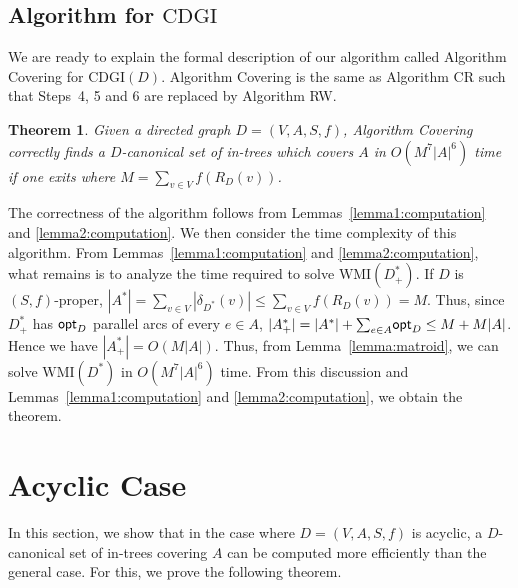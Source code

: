 \documentclass[11pt]{article}
\newcounter{ni}
\theoremstyle{plain}
\newtheorem{theorem}{Theorem}[section]
\newcommand{\eop}{\hfill \usebox{\ProofSym}}
\newenvironment{proof}{\noindent {\it Proof.}}{\eop\par\vspace{0.3cm}}
\begin{document}
\subsection{Algorithm for $\mbox{CDGI}$}

We are ready to explain the formal description of our algorithm 
called Algorithm {\sf Covering} for $\mbox{CDGI}(D)$.
Algorithm {\sf Covering} is the same as Algorithm {\sf CR} such that 
Steps~4, 5 and 6 are replaced by Algorithm {\sf RW}.

\begin{theorem}
Given a directed graph  $D=(V,A,S,f)$, Algorithm {\sf Covering} correctly finds 
a $D$-canonical set of in-trees which covers $A$ in $O(M^7|A|^6)$ time 
if one exits where $M=\sum_{v\in V}f(R_D(v))$.
\end{theorem}
\begin{proof}
The correctness of the algorithm follows from Lemmas~\ref{lemma1:computation} and 
\ref{lemma2:computation}. We then consider the time complexity of this algorithm.
From Lemmas~\ref{lemma1:computation} and \ref{lemma2:computation}, 
what remains is to analyze the time required to solve $\mbox{WMI}(D_+^{\ast})$. 
If $D$ is $(S,f)$-proper,  
$|A^{\ast}|
=\mbox{$\sum$}_{v \in V}|\delta_{D^{\ast}}(v)| 
\le \mbox{$\sum$}_{v\in V}f(R_D(v))=M$.  
Thus, since $D_+^{\ast}$ has ${\sf opt}_D$ parallel arcs of every $e \in A$,  
$|A_+^{\ast}| = |A^{\ast}| + \mbox{$\sum$}_{e \in A}{\sf opt}_D\le M + M|A|$.
Hence we have $|A_+^{\ast}|=O(M|A|)$. 
Thus, from Lemma~\ref{lemma:matroid}, we can solve $\mbox{WMI}(D^{\ast})$ in 
$O(M^7|A|^6)$ time. 
From this discussion and Lemmas~\ref{lemma1:computation} 
and \ref{lemma2:computation}, we obtain the theorem.  
\end{proof}

\section{Acyclic Case}
\label{Acyclic Case}

In this section, we show that in the case where $D=(V,A,S,f)$ is acyclic, 
a $D$-canonical set of in-trees covering $A$ 
can be computed more efficiently than the general case. 
For this, we prove the following theorem. 
\end{document}
